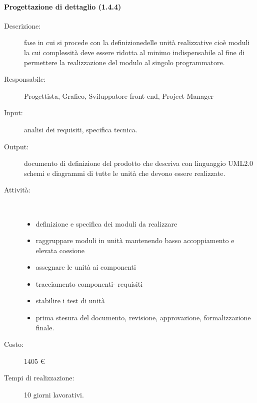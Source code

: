 \paragraph{Progettazione di dettaglio (1.4.4)}
\begin{description}
\item[Descrizione:] fase in cui si procede con la definizionedelle unit\`{a} realizzative cio\`{e} moduli la cui complessit\`{a} deve essere ridotta al minimo indispensabile al fine di permettere la realizzazione del modulo al singolo programmatore.
\item[Responsabile:] Progettista, Grafico, Sviluppatore front-end, Project Manager
\item[Input:] analisi dei requisiti, specifica tecnica.
\item[Output:] documento di definizione del prodotto che descriva con linguaggio UML2.0 schemi e diagrammi di tutte le unità che devono essere realizzate.
\item[Attività:]\mbox{}\\[-1.5\baselineskip]
	\begin{itemize}
	\item definizione e specifica dei moduli da realizzare
	\item raggruppare moduli in unità mantenendo basso accoppiamento e elevata coesione
	\item assegnare le unità ai componenti
	\item tracciamento componenti- requisiti
	\item stabilire i test di unità
	\item prima stesura del documento, revisione, approvazione, formalizzazione finale.
	\end{itemize}
\item[Costo:] 1405 \euro{}
\item[Tempi di realizzazione:] 10 giorni lavorativi.
\end{description}

